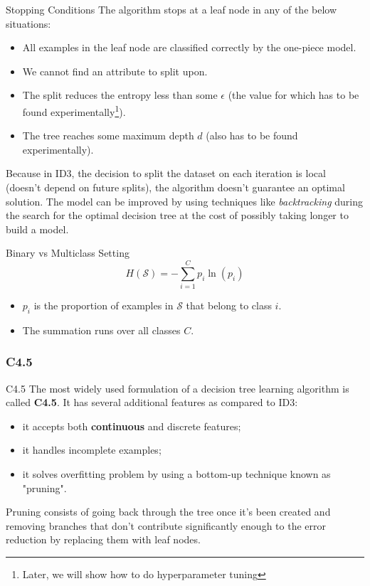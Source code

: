 \documentclass[9pt,dvipsnames]{beamer}
\begin{document}
	\begin{frame}{Stopping Conditions}
		The algorithm stops at a leaf node in any of the below situations:
		\begin{itemize}
			\item All examples in the leaf node are classified correctly by the one-piece model.
			\item We cannot find an attribute to split upon.
			\item The split reduces the entropy less than some $\epsilon$ (the value for which has to be found experimentally\footnote{Later, we will show how to do hyperparameter tuning}).
			\item The tree reaches some maximum depth $d$ (also has to be found experimentally).
		\end{itemize}
		Because in ID3, the decision to split the dataset on each iteration is local (doesn't depend on future splits), the algorithm doesn't guarantee an optimal solution. The model can be improved by using techniques like \textit{backtracking} during the search for the optimal decision tree at the cost of possibly taking longer to build a model.
	\end{frame}
	\begin{frame}{Binary vs Multiclass Setting}
		$$
		H(\mathcal{S})=-\sum_{i=1}^C p_i \ln \left(p_i\right)
		$$
		\begin{itemize}
			\item $p_i$ is the proportion of examples in $\mathcal{S}$ that belong to class $i$.
			\item The summation runs over all classes $C$.
		\end{itemize}
	\end{frame}
	\subsubsection{C4.5}
	\begin{frame}{C4.5}
		The most widely used formulation of a decision tree learning algorithm is called \textbf{C4.5}. It has several additional features as compared to ID3:
		\begin{itemize}
			\item it accepts both \textbf{continuous} and discrete features;
			\item it handles incomplete examples;
			\item it solves overfitting problem by using a bottom-up technique known as "pruning".
		\end{itemize}
		Pruning consists of going back through the tree once it's been created and removing branches that don't contribute significantly enough to the error reduction by replacing them with leaf nodes.
	\end{frame}
	
\end{document}
